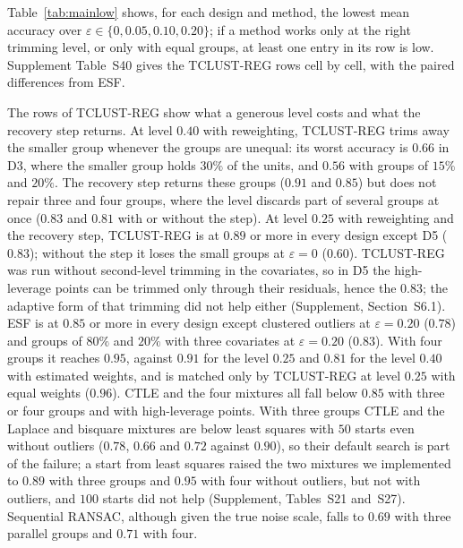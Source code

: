 Table~\ref{tab:mainlow} shows, for each design and method, the lowest mean accuracy over
$\varepsilon\in\{0,0.05,0.10,0.20\}$; if a method works only at the right trimming level, or
only with equal groups, at least one entry in its row is low. Supplement Table~S40 gives the
TCLUST-REG rows cell by cell, with the paired differences from ESF.



The rows of TCLUST-REG show what a generous level costs and what the recovery step returns. At
level $0.40$ with reweighting, TCLUST-REG trims away the smaller group whenever the groups are
unequal: its worst accuracy is $0.66$ in D3, where the smaller group holds $30\%$ of the units,
and $0.56$ with groups of $15\%$ and $20\%$. The recovery step returns these groups ($0.91$ and
$0.85$) but does not repair three and four groups, where the level discards part of several
groups at once ($0.83$ and $0.81$ with or without the step). At level $0.25$ with reweighting
and the recovery step, TCLUST-REG is at $0.89$ or more in every design except D5 ($0.83$);
without the step it loses the small groups at $\varepsilon=0$ ($0.60$). TCLUST-REG was run
without second-level trimming in the covariates, so in D5 the high-leverage points can be
trimmed only through their residuals, hence the $0.83$; the adaptive form of that trimming did
not help either (Supplement, Section~S6.1).
ESF is at $0.85$ or more in every design except clustered outliers at $\varepsilon=0.20$
($0.78$) and groups of $80\%$ and $20\%$ with three covariates at $\varepsilon=0.20$ ($0.83$).
With four groups it reaches $0.95$, against $0.91$ for the level $0.25$ and $0.81$ for the level
$0.40$ with estimated weights, and is matched only by TCLUST-REG at level $0.25$ with equal
weights ($0.96$). CTLE and the four mixtures all fall below $0.85$ with three or four groups and with
high-leverage points. With three groups CTLE and the Laplace and bisquare mixtures are below least
squares with $50$ starts even without outliers ($0.78$, $0.66$ and $0.72$ against $0.90$), so
their default search is part of the failure; a start from least squares raised the two mixtures
we implemented to $0.89$ with three groups and $0.95$ with four without outliers, but not with
outliers, and $100$ starts did not help (Supplement, Tables~S21 and~S27). Sequential RANSAC, although given the true noise scale, falls to
$0.69$ with three parallel groups and $0.71$ with four.

